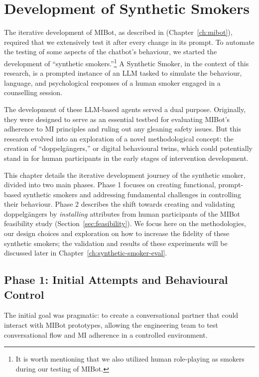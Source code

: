 \chapter{Development of Synthetic Smokers}
\label{ch:synthetic-smoker}

The iterative development of MIBot, as described in (Chapter~\ref{ch:mibot}), required that we extensively test it after every change in its prompt. To automate the testing of some aspects of the chatbot's behaviour, we started the development of ``synthetic smokers.''\footnote{It is worth mentioning that we also utilized human role-playing as smokers during our testing of MIBot.} A Synthetic Smoker, in the context of this research, is a prompted instance of an LLM tasked to simulate the behaviour, language, and psychological responses of a human smoker engaged in a counselling session.

The development of these LLM-based agents served a dual purpose. Originally, they were designed to serve as an essential testbed for evaluating MIBot's adherence to MI principles and ruling out any gleaning safety issues. But this research evolved into an exploration of a novel methodological concept: the creation of ``doppelgängers,'' or digital behavioural twins, which could potentially stand in for human participants in the early stages of intervention development.

This chapter details the iterative development journey of the synthetic smoker, divided into two main phases. Phase 1 focuses on creating functional, prompt-based synthetic smokers and addressing fundamental challenges in controlling their behaviour. Phase 2 describes the shift towards creating and validating doppelgängers by \emph{installing} attributes from human participants of the MIBot feasibility study (Section~\ref{sec:feasibility}). We focus here on the methodologies, our design choices and exploration on how to increase the fidelity of these synthetic smokers; the validation and results of these experiments will be discussed later in Chapter~\ref{ch:synthetic-smoker-eval}.

\section{Phase 1: Initial Attempts and Behavioural Control}
The initial goal was pragmatic: to create a conversational partner that could interact with MIBot prototypes, allowing the engineering team to test conversational flow and MI adherence in a controlled environment.

